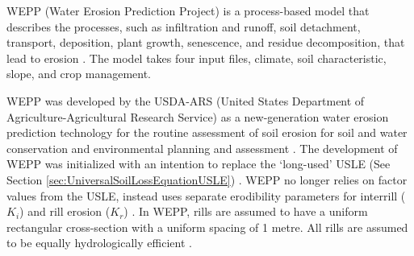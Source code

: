WEPP (Water Erosion Prediction Project) is a process-based model that describes
the processes, such as infiltration and runoff, soil detachment, transport,
deposition, plant growth, senescence, and residue decomposition, that lead to
erosion \citep{flanagan1995-usda}. The model takes four input files, climate,
soil characteristic, slope, and crop management.

WEPP was developed by the USDA-ARS (United States Department of
Agriculture-Agricultural Research Service) as a new-generation water erosion
prediction technology for the routine assessment of soil erosion for soil and
water conservation and environmental planning and assessment
\citep{flanagan2007-1603}. The development of WEPP was initialized with an
intention to replace the `long-used' USLE (See Section
\ref{sec:UniversalSoilLossEquationUSLE}) \citep{nearing1989-1587,
flanagan1995-usda}. WEPP no longer relies on factor values from the USLE,
instead uses separate erodibility parameters for interrill ($K_i$) and rill
erosion ($K_r$) \citep{flanagan1995-usda}. In WEPP, rills are assumed to have a
uniform rectangular cross-section with a uniform spacing of 1 metre. All rills
are assumed to be equally hydrologically efficient \citep{flanagan1995-usda}.

